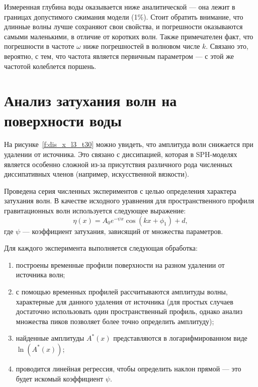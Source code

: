 Измеренная глубина воды оказывается ниже аналитической --- она лежит в границах допустимого сжимания модели (1\%).
%
Стоит обратить внимание, что длинные волны лучше сохраняют свои свойства, и погрешности оказываются самыми маленькими, 
в отличие от коротких волн.
%
Также примечателен факт, что погрешности в частоте $\omega$ ниже погрешностей в волновом числе $k$.
%
Связано это, вероятно, с тем, что частота является первичным параметром --- с этой же частотой колеблется поршень.



\section{Анализ затухания волн на поверхности воды}\label{sec:dis_fade}

На рисунке~\ref{f:dis_x_l3_t30} можно увидеть, что амплитуда волн снижается при удалении от источника.
%
Это связано с диссипацией, которая в SPH-моделях является особенно сложной из-за присутствия различного рода
численных диссипативных членов (например, искусственной вязкости).

Проведена серия численных экспериментов с целью определения характера затухания волн.
%
В качестве исходного уравнения для пространственного профиля гравитационных волн используется следующее выражение:
%
\begin{equation}
    \eta(x)=A_{0} e^{-\psi x} \cos (kx + \phi_{1}) + d,
\end{equation}
%
где $\psi$ --- коэффициент затухания, зависящий от множества параметров.

Для каждого эксперимента выполняется следующая обработка:
\begin{enumerate}
    \item построены временные профили поверхности на разном удалении от источника волн;
    \item с помощью временных профилей рассчитываются амплитуды волны, характерные для данного удаления от источника
        (для простых случаев достаточно использовать один пространственный профиль, 
        однако анализ множества пиков позволяет более точно определить амплитуду);
    \item найденные амплитуды $A^{*}(x)$ представляются в логарифмированном виде $\ln(A^{*}(x))$;
    \item проводится линейная регрессия, чтобы определить наклон прямой --- это будет искомый коэффициент $\psi$.
\end{enumerate}

